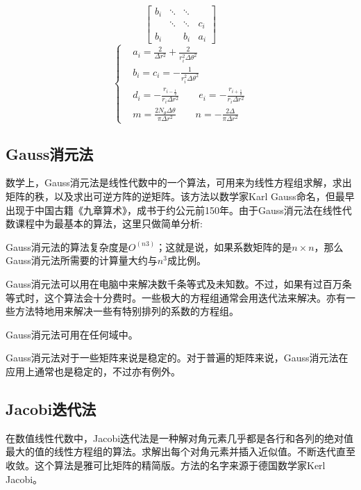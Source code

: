 \documentclass[twoside,twocolumn]{article}
\begin{document}
\begin{CJK*}{UTF8}{gkai}
\begin{equation*}
\begin{bmatrix}
	b_{i}&\ddots&\ddots&\\
	&\ddots&\ddots&c_{i}\\
	b_{i}&&b_{i}&a_{i}
	\end{bmatrix}
	\end{equation*}
	\begin{equation*}
	\left\{
	\begin{aligned}
	&a_{i}=\frac{2}{\Delta r^{2}}+\frac{2}{r_{i}^{2}\Delta\theta^{2}}\\
	&b_{i}=c_{i}=-\frac{1}{r_{i}^{2}\Delta\theta^{2}}\\
	&d_{i}=-\frac{r_{i-\frac{1}{2}}}{r_{i}\Delta r^{2}}\qquad e_{i}=-\frac{r_{i+\frac{1}{2}}}{r_{i}\Delta r^{2}}\\
	&m=\frac{2N_{\theta}\Delta \theta}{\pi\Delta r^{2}}\qquad n=-\frac{2\Delta}{\pi\Delta r^{2}}
	\end{aligned}
	\right.
	\end{equation*}
	\subsection{Gauss消元法}
	数学上，Gauss消元法是线性代数中的一个算法，可用来为线性方程组求解，求出矩阵的秩，以及求出可逆方阵的逆矩阵。该方法以数学家Karl Gauss命名，但最早出现于中国古籍《九章算术》，成书于约公元前150年。由于Gauss消元法在线性代数课程中为最基本的算法，这里只做简单分析:
	
	Gauss消元法的算法复杂度是$O^(n3)$；这就是说，如果系数矩阵的是$n\times n$，那么Gauss消元法所需要的计算量大约与$n^{3}$成比例。
	
	Gauss消元法可以用在电脑中来解决数千条等式及未知数。不过，如果有过百万条等式时，这个算法会十分费时。一些极大的方程组通常会用迭代法来解决。亦有一些方法特地用来解决一些有特别排列的系数的方程组。
	
	Gauss消元法可用在任何域中。
	
	Gauss消元法对于一些矩阵来说是稳定的。对于普遍的矩阵来说，Gauss消元法在应用上通常也是稳定的，不过亦有例外。
	\subsection{Jacobi迭代法}
	在数值线性代数中，Jacobi迭代法是一种解对角元素几乎都是各行和各列的绝对值最大的值的线性方程组的算法。求解出每个对角元素并插入近似值。不断迭代直至收敛。这个算法是雅可比矩阵的精简版。方法的名字来源于德国数学家Kerl Jacobi。

\end{CJK*}
\end{document}
